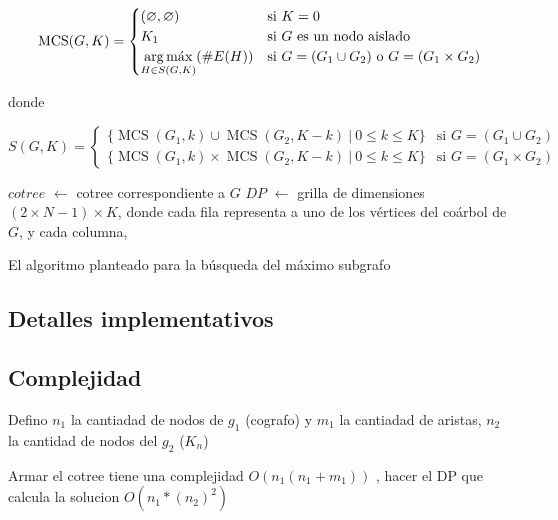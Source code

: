 \[
    \operatorname{MCS}(G, K) = \begin{cases}
        (\varnothing, \varnothing) & \text{si } K = 0 \\
        K_1 & \text{si } G \text{ es un nodo aislado} \\
        \displaystyle \argmax_{H \in S(G, K)}(\#E(H)) & \text{si } G = (G_1
        \cup G_2) \text{ o } G = (G_1 \times G_2) \\
    \end{cases}
\]

donde

\[
    S(G, K) = \begin{cases}
        \lbrace \operatorname{MCS}(G_1, k) \cup \operatorname{MCS}(G_2, K -
        k) \ \vert\ 0 \leq k \leq K \rbrace & \text{si } G = (G_1 \cup G_2) \\
        \lbrace \operatorname{MCS}(G_1, k) \times \operatorname{MCS}(G_2, K -
        k) \ \vert\ 0 \leq k \leq K \rbrace & \text{si } G = (G_1 \times G_2)
    \end{cases}
\]

\begin{algorithm}[H]

    $cotree$ $\gets$ cotree correspondiente a $G$ \;
    $DP$ $\gets$ grilla de dimensiones $(2 \times N - 1) \times K$, donde \;
    cada fila representa a uno de los vértices del coárbol de $G$, y cada \;
    columna,
\end{algorithm}


El algoritmo planteado para la búsqueda del máximo subgrafo


\subsection{Detalles implementativos}

\subsection{Complejidad}
Defino $n_1$ la cantiadad de nodos de $g_1$ (cografo) y $m_1$ la cantiadad de aristas, 
$n_2$ la cantidad de nodos del $g_2$ ($K_n$) 

Armar el cotree tiene una complejidad $O(n_1(n_1 + m_1))$ , hacer el DP que calcula la solucion $O(n_1 * (n_2)^2 )$

